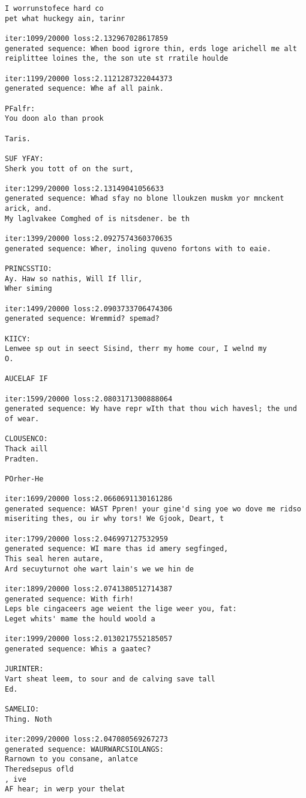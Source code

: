 \documentclass[11pt]{article}
\begin{document}
\begin{Verbatim}[commandchars=\\\{\}]
I worrunstofece hard co
pet what huckegy ain, tarinr

iter:1099/20000 loss:2.132967028617859
generated sequence: When bood igrore thin, erds loge arichell me alt reiplittee loines the, the son ute st rratile houlde

iter:1199/20000 loss:2.1121287322044373
generated sequence: Whe af all paink.

PFalfr:
You doon alo than prook

Taris.

SUF YFAY:
Sherk you tott of on the surt, 

iter:1299/20000 loss:2.13149041056633
generated sequence: Whad sfay no blone lloukzen muskm yor mnckent arick, and.
My laglvakee Comghed of is nitsdener. be th

iter:1399/20000 loss:2.0927574360370635
generated sequence: Wher, inoling quveno fortons with to eaie.

PRINCSSTIO:
Ay. Haw so nathis, Will If llir,
Wher siming 

iter:1499/20000 loss:2.0903733706474306
generated sequence: Wremmid? spemad?

KIICY:
Lenwee sp out in seect Sisind, therr my home cour, I welnd my
O.

AUCELAF IF

iter:1599/20000 loss:2.0803171300888064
generated sequence: Wy have repr wIth that thou wich havesl; the und of wear.

CLOUSENCO:
Thack aill
Pradten.

POrher-He 

iter:1699/20000 loss:2.0660691130161286
generated sequence: WAST Ppren! your gine'd sing yoe wo dove me ridso miseriting thes, ou ir why tors! We Gjook, Deart, t

iter:1799/20000 loss:2.046997127532959
generated sequence: WI mare thas id amery segfinged,
This seal heren autare,
Ard secuyturnot ohe wart lain's we we hin de

iter:1899/20000 loss:2.0741380512714387
generated sequence: With firh!
Leps ble cingaceers age weient the lige weer you, fat:
Leget whits' mame the hould woold a

iter:1999/20000 loss:2.0130217552185057
generated sequence: Whis a gaatec?

JURINTER:
Vart sheat leem, to sour and de calving save tall
Ed.

SAMELIO:
Thing. Noth

iter:2099/20000 loss:2.047080569267273
generated sequence: WAURWARCSIOLANGS:
Rarnown to you consane, anlatce
Theredsepus ofld
, ive
AF hear; in werp your thelat


\end{Verbatim}
\end{document}
